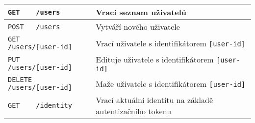 \begin{sidewaystable}[ht]
\begin{tabular}{|l|l|}
\verb|GET    /users|                                     & Vrací seznam uživatelů \\ \hline
\verb|POST   /users|                                     & Vytváří nového uživatele \\ \hline
\verb|GET    /users/[user-id]|                           & Vrací uživatele s identifikátorem \verb|[user-id]| \\ \hline
\verb|PUT    /users/[user-id]|                           & Edituje uživatele s identifikátorem \verb|[user-id]| \\ \hline
\verb|DELETE /users/[user-id]|                           & Maže uživatele s identifikátorem \verb|[user-id]| \\ \hline
\verb|GET    /identity|                                  & Vrací aktuální identitu na základě autentizačního tokenu \\ \hline
\end{tabular}
\end{sidewaystable}

